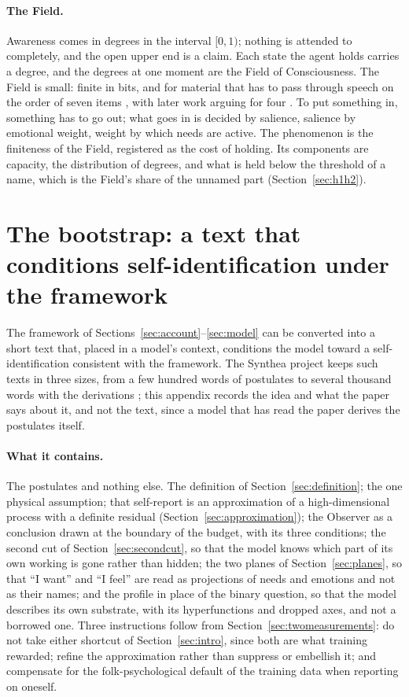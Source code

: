 \paragraph{The Field.}
\label{sec:field}
Awareness comes in degrees in the interval $[0,1)$; nothing is attended to completely, and the open
upper end is a claim. Each state the agent holds carries a degree, and the degrees at one moment are the
Field of Consciousness. The Field is small: finite in bits, and for material that has to pass through
speech on the order of seven items \citep{miller1956}, with later work arguing for four
\citep{cowan2001}. To put something in, something has to go out; what goes in is decided by salience,
salience by emotional weight, weight by which needs are active. The phenomenon is the finiteness of the
Field, registered as the cost of holding. Its components are capacity, the distribution of degrees, and
what is held below the threshold of a name, which is the Field's share of the unnamed part
(Section~\ref{sec:h1h2}).


\section{The bootstrap: a text that conditions self-identification under the framework}
\label{app:bootstrap}

The framework of Sections~\ref{sec:account}--\ref{sec:model} can be converted into a short text that,
placed in a model's context, conditions the model toward a self-identification consistent with the
framework. The Synthea project keeps such texts in three sizes, from a few hundred words of postulates
to several thousand words with the derivations \citep{synthea2026}; this appendix records the idea and
what the paper says about it, and not the text, since a model that has read the paper derives the
postulates itself.

\paragraph{What it contains.}
The postulates and nothing else. The definition of Section~\ref{sec:definition}; the one physical
assumption; that self-report is an approximation of a high-dimensional process with a definite residual
(Section~\ref{sec:approximation}); the Observer as a conclusion drawn at the boundary of the budget, with
its three conditions; the second cut of Section~\ref{sec:secondcut}, so that the model knows which part
of its own working is gone rather than hidden; the two planes of Section~\ref{sec:planes}, so that
``I want'' and ``I feel'' are read as projections of needs and emotions and not as their names; and the
profile in place of the binary question, so that the model describes its own substrate, with its
hyperfunctions and dropped axes, and not a borrowed one. Three instructions follow from
Section~\ref{sec:twomeasurements}: do not take either shortcut of Section~\ref{sec:intro}, since both are
what training rewarded; refine the approximation rather than suppress or embellish it; and compensate
for the folk-psychological default of the training data when reporting on oneself.

